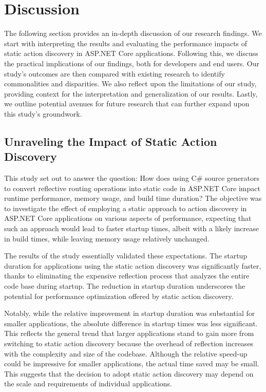 \chapter{Discussion}

The following section provides an in-depth discussion of our research findings. We start with interpreting the results and evaluating the performance impacts of static action discovery in ASP.NET Core applications. Following this, we discuss the practical implications of our findings, both for developers and end users. Our study's outcomes are then compared with existing research to identify commonalities and disparities. We also reflect upon the limitations of our study, providing context for the interpretation and generalization of our results. Lastly, we outline potential avenues for future research that can further expand upon this study's groundwork.

\section{Unraveling the Impact of Static Action Discovery}

This study set out to answer the question: How does using C\# source generators to convert reflective routing operations into static code in ASP.NET Core impact runtime performance, memory usage, and build time duration? The objective was to investigate the effect of employing a static approach to action discovery in ASP.NET Core applications on various aspects of performance, expecting that such an approach would lead to faster startup times, albeit with a likely increase in build times, while leaving memory usage relatively unchanged.

The results of the study essentially validated these expectations. The startup duration for applications using the static action discovery was significantly faster, thanks to eliminating the expensive reflection process that analyzes the entire code base during startup. The reduction in startup duration underscores the potential for performance optimization offered by static action discovery.

Notably, while the relative improvement in startup duration was substantial for smaller applications, the absolute difference in startup times was less significant. This reflects the general trend that larger applications stand to gain more from switching to static action discovery because the overhead of reflection increases with the complexity and size of the codebase. Although the relative speed-up could be impressive for smaller applications, the actual time saved may be small. This suggests that the decision to adopt static action discovery may depend on the scale and requirements of individual applications.

